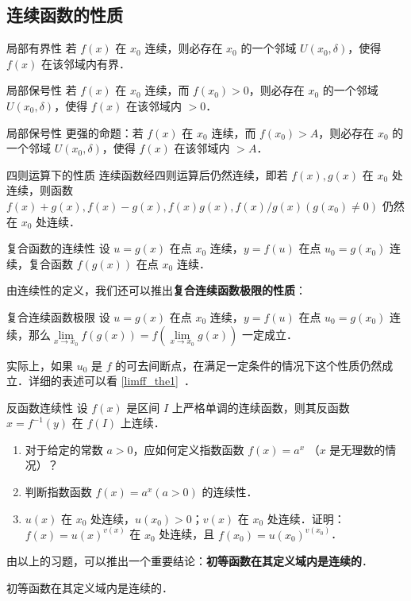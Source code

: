 \subsection{连续函数的性质}
\begin{theorem}{局部有界性}
若 $f(x)$ 在 $x_0$ 连续，则必存在 $x_0$ 的一个邻域 $U(x_0,\delta)$，使得 $f(x)$ 在该邻域内有界．
\end{theorem}
\begin{theorem}{局部保号性}
若 $f(x)$ 在 $x_0$ 连续，而 $f(x_0)>0$，则必存在 $x_0$ 的一个邻域 $U(x_0,\delta)$，使得 $f(x)$ 在该邻域内 $>0$．
\end{theorem}
\begin{theorem}{局部保号性}
更强的命题：若 $f(x)$ 在 $x_0$ 连续，而 $f(x_0)>A$，则必存在 $x_0$ 的一个邻域 $U(x_0,\delta)$，使得 $f(x)$ 在该邻域内 $>A$．
\end{theorem}
\begin{theorem}{四则运算下的性质}
连续函数经四则运算后仍然连续，即若 $f(x),g(x)$ 在 $x_0$ 处连续，则函数 $f(x)+g(x),f(x)-g(x),f(x)g(x),f(x)/g(x)(g(x_0)\neq 0)$ 仍然在 $x_0$ 处连续．
\end{theorem}

\begin{theorem}{复合函数的连续性}
设 $u=g(x)$ 在点 $x_0$ 连续，$y=f(u)$ 在点 $u_0=g(x_0)$ 连续，复合函数 $f(g(x))$ 在点 $x_0$ 连续．
\end{theorem}

由连续性的定义，我们还可以推出\textbf{复合连续函数极限的性质}：
\begin{theorem}{复合连续函数极限}
设 $u=g(x)$ 在点 $x_0$ 连续，$y=f(u)$ 在点 $u_0=g(x_0)$ 连续，那么$\lim\limits_{x\rightarrow x_0}f(g(x))=f(\lim\limits_{x\rightarrow x_0}g(x))$ 一定成立．
\end{theorem}


实际上，如果 $u_0$ 是 $f$ 的可去间断点，在满足一定条件的情况下这个性质仍然成立．详细的表述可以看 \autoref{limff_the1}~．

\begin{theorem}{反函数连续性}
设 $f(x)$ 是区间 $I$ 上严格单调的连续函数，则其反函数 $x=f^{-1}(y)$ 在 $f(I)$ 上连续．
\end{theorem}

\begin{exercise}{}
\begin{enumerate}
\item 对于给定的常数 $a>0$，应如何定义指数函数 $f(x)=a^x$ （$x$ 是无理数的情况）？
\item 判断指数函数 $f(x)=a^x(a>0)$ 的连续性．
\item $u(x)$ 在 $x_0$ 处连续，$u(x_0)>0$；$v(x)$ 在 $x_0$ 处连续．证明： $f(x)=u(x)^{v(x)}$ 在 $x_0$ 处连续，且 $f(x_0)=u(x_0)^{v(x_0)}$．
\end{enumerate}

由以上的习题，可以推出一个重要结论：\textbf{初等函数在其定义域内是连续的}．
\end{exercise}
\begin{theorem}{}
初等函数在其定义域内是连续的．
\end{theorem}